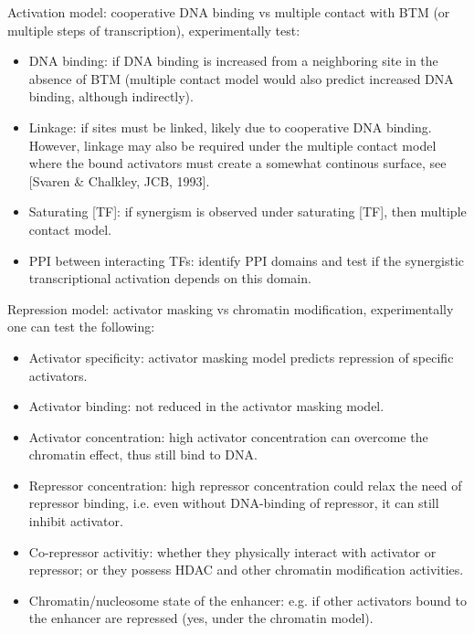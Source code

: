\documentclass{report}
\begin{document}
Activation model: cooperative DNA binding vs multiple contact with BTM (or multiple steps of transcription), experimentally test: 
\begin{itemize}
	\item DNA binding: if DNA binding is increased from a neighboring site in the absence of BTM (multiple contact model would also predict increased DNA binding, although indirectly). 
	\item Linkage: if sites must be linked, likely due to cooperative DNA binding. However, linkage may also be required under the multiple contact model where the bound activators must create a somewhat continous surface, see [Svaren \& Chalkley, JCB, 1993].
	\item Saturating [TF]: if synergism is observed under saturating [TF], then multiple contact model. 
	\item PPI between interacting TFs: identify PPI domains and test if the synergistic transcriptional activation depends on this domain. 
\end{itemize}

Repression model: activator masking vs chromatin modification, experimentally one can test the following: 
\begin{itemize}
	\item Activator specificity: activator masking model predicts repression of specific activators. 
	\item Activator binding: not reduced in the activator masking model. 
	\item Activator concentration: high activator concentration can overcome the chromatin effect, thus still bind to DNA. 
	\item Repressor concentration: high repressor concentration could relax the need of repressor binding, i.e. even without DNA-binding of repressor, it can still inhibit activator. 
	\item Co-repressor activitiy: whether they physically interact with activator or repressor; or they possess HDAC and other chromatin modification activities. 
	\item Chromatin/nucleosome state of the enhancer: e.g. if other activators bound to the enhancer are repressed (yes, under the chromatin model). 
\end{itemize}
\end{document}
